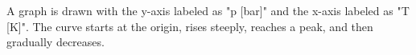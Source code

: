 A graph is drawn with the y-axis labeled as "p [bar]" and the x-axis labeled as "T [K]". The curve starts at the origin, rises steeply, reaches a peak, and then gradually decreases.